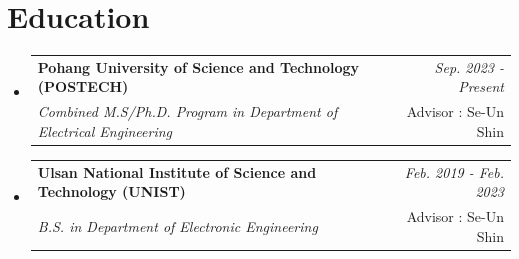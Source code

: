 \documentclass[a4paper,11pt]{article}
\makeatletter
\newcommand{\resumeSubheading}[4]{
\vspace{0.5mm}\item
    \begin{tabular*}{0.98\textwidth}[t]{l@{\extracolsep{\fill}}r}
        \textbf{#1} & \textit{\footnotesize{#4}} \\
        \textit{\footnotesize{#3}} &  \footnotesize{#2}\\
    \end{tabular*}
    \vspace{-2.4mm}
}
\newcommand{\resumeProject}[4]{
\vspace{0.5mm}\item
    \begin{tabular*}{0.98\textwidth}[t]{l@{\extracolsep{\fill}}r}
        \textbf{#1} & \textit{\footnotesize{#3}} \\
        \footnotesize{\textit{#2}} & \footnotesize{#4}
    \end{tabular*}
    \vspace{-2.4mm}
}
\newcommand{\resumeSubHeadingListStart}{\begin{itemize}[leftmargin=*,labelsep=0mm]}
\newcommand{\resumeItemListStart}{\begin{justify}\begin{itemize}[leftmargin=3ex, rightmargin=2ex, noitemsep,labelsep=1.2mm,itemsep=0mm]\small}
\newcommand{\resumeSubHeadingListEnd}{\end{itemize}\vspace{2mm}}
\newcommand{\resumeItemListEnd}{\end{itemize}\end{justify}\vspace{-2mm}}
\makeatother
\begin{document}
\section{\textbf{Education}}
  \resumeSubHeadingListStart
    \resumeSubheading
      { Pohang University of Science and Technology (POSTECH)}{Advisor : Se-Un Shin}
      {Combined M.S/Ph.D. Program in Department of Electrical Engineering}{Sep. 2023 - Present}
    \resumeSubheading
      { Ulsan National Institute of Science and Technology (UNIST)}{Advisor : Se-Un Shin}
      {B.S. in Department of Electronic Engineering}{Feb. 2019 - Feb. 2023}
  \resumeSubHeadingListEnd
\vspace{-5.5mm}
%



    

    
      

\end{document}
